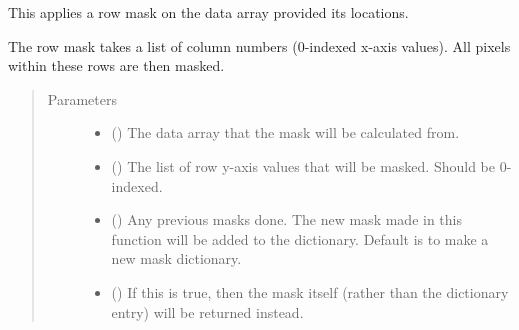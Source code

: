 \documentclass[letterpaper,10pt,english]{sphinxmanual}
\begin{document}

\begin{fulllineitems}
\label{\detokenize{python_docstrings/IfA_Smeargle.echo.masks.masks_echo300:IfA_Smeargle.echo.masks.masks_echo300.echo383_row_mask}}
This applies a row mask on the data array provided its locations.

The row mask takes a list of column numbers (0-indexed x-axis values).
All pixels within these rows are then masked.
\begin{quote}\begin{description}
\item[{Parameters}] \leavevmode\begin{itemize}
\item {} 
 () \textendash{} The data array that the mask will be calculated from.

\item {} 
 () \textendash{} The list of row y-axis values that will be masked. Should be
0-indexed.

\item {} 
 (\sphinxstyleliteralemphasis{\sphinxupquote{ (}}\sphinxstyleliteralemphasis{\sphinxupquote{)}}) \textendash{} Any previous masks done. The new mask made in this function will be
added to the dictionary. Default is to make a new mask dictionary.

\item {} 
 (\sphinxstyleliteralemphasis{\sphinxupquote{ (}}\sphinxstyleliteralemphasis{\sphinxupquote{)}}) \textendash{} If this is true, then the mask itself (rather than the dictionary
entry) will be returned instead.


\end{itemize}
\end{description}
\end{quote}
\end{fulllineitems}
\end{document}
